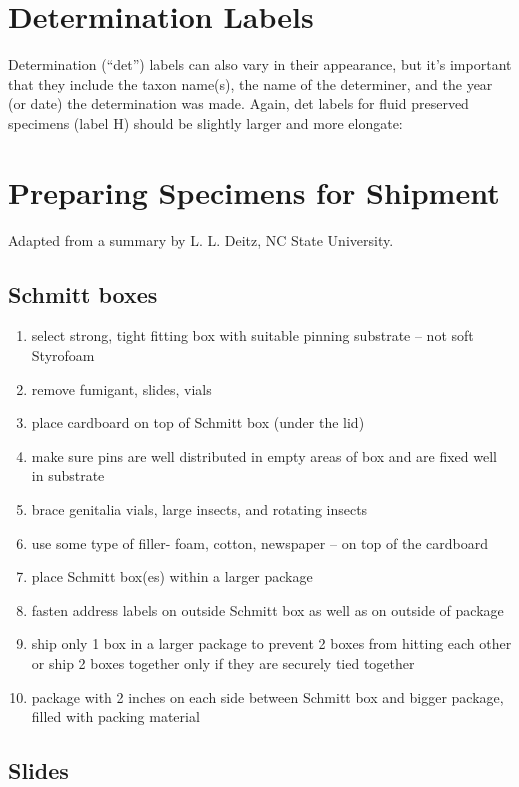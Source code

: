 \documentclass[letterpaper, 11pt]{article}
\begin{document}
\section{Determination Labels}
Determination (``det'') labels can also vary in their appearance, but it’s important that they include the taxon name(s), the name of the determiner, and the year (or date) the determination was made. Again, det labels for fluid preserved specimens (label H) should be slightly larger and more elongate:


\section{Preparing Specimens for Shipment}

Adapted from a summary by L. L. Deitz, NC State University.%
 

\subsection{Schmitt boxes}

\begin{enumerate}
\item select strong, tight fitting box with suitable pinning substrate – not soft Styrofoam
\item remove fumigant, slides, vials
\item place cardboard on top of Schmitt box (under the lid)
\item make sure pins are well distributed in empty areas of box and are fixed well in substrate
\item brace genitalia vials, large insects, and rotating insects
\item use some type of filler- foam, cotton, newspaper – on top of the cardboard
\item place Schmitt box(es) within a larger package
\item fasten address labels on outside Schmitt box as well as on outside of package
\item ship only 1 box in a larger package to prevent 2 boxes from hitting each other or ship 2 boxes together only if they are securely tied together
\item package with 2 inches on each side between Schmitt box and bigger package, filled with packing material
\end{enumerate}

\subsection*{Slides}
\end{document}
